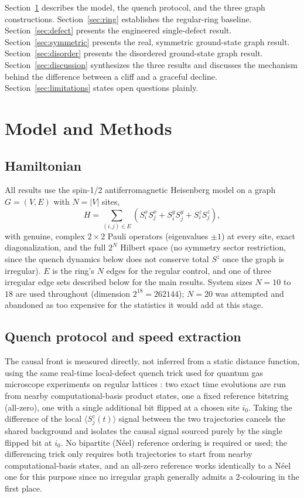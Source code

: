 \documentclass[11pt]{article}
\begin{document}
Section~\ref{sec:methods} describes the model, the quench protocol, and the three graph constructions. Section~\ref{sec:ring} establishes the regular-ring baseline. Section~\ref{sec:defect} presents the engineered single-defect result. Section~\ref{sec:symmetric} presents the real, symmetric ground-state graph result. Section~\ref{sec:disorder} presents the disordered ground-state graph result. Section~\ref{sec:discussion} synthesizes the three results and discusses the mechanism behind the difference between a cliff and a graceful decline. Section~\ref{sec:limitations} states open questions plainly.

\section{Model and Methods}
\label{sec:methods}

\subsection{Hamiltonian}

All results use the spin-1/2 antiferromagnetic Heisenberg model on a graph $G=(V,E)$ with $N=|V|$ sites,
\[
H = \sum_{(i,j)\in E} \left(S^x_i S^x_j + S^y_i S^y_j + S^z_i S^z_j\right),
\]
with genuine, complex $2\times2$ Pauli operators (eigenvalues $\pm1$) at every site, exact diagonalization, and the full $2^N$ Hilbert space (no symmetry sector restriction, since the quench dynamics below does not conserve total $S^z$ once the graph is irregular). $E$ is the ring's $N$ edges for the regular control, and one of three irregular edge sets described below for the main results. System sizes $N=10$ to $18$ are used throughout (dimension $2^{18}=262144$); $N=20$ was attempted and abandoned as too expensive for the statistics it would add at this stage.

\subsection{Quench protocol and speed extraction}

The causal front is measured directly, not inferred from a static distance function, using the same real-time local-defect quench trick used for quantum gas microscope experiments on regular lattices \cite{Cheneau2012}: two exact time evolutions are run from nearby computational-basis product states, one a fixed reference bitstring (all-zero), one with a single additional bit flipped at a chosen site $i_0$. Taking the difference of the local $\langle S^z_j(t)\rangle$ signal between the two trajectories cancels the shared background and isolates the causal signal sourced purely by the single flipped bit at $i_0$. No bipartite (N\'eel) reference ordering is required or used; the differencing trick only requires both trajectories to start from nearby computational-basis states, and an all-zero reference works identically to a N\'eel one for this purpose since no irregular graph generally admits a 2-colouring in the first place.
\end{document}
